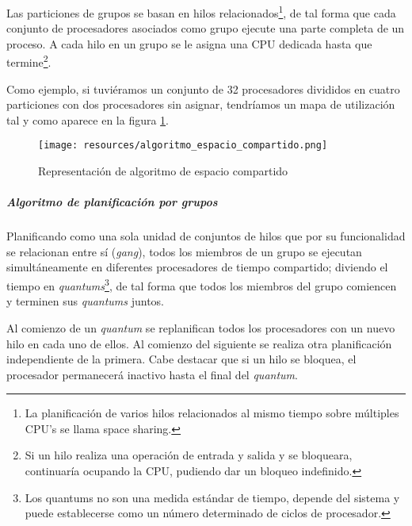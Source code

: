 \documentclass[a4paper, 11pt, titlepage]{article}
\begin{document}
                    Las particiones de grupos se basan en hilos relacionados\footnote{
                        La planificación de varios hilos relacionados al mismo tiempo sobre múltiples CPU’s se 
                        llama space sharing. 
                    }, de tal forma que cada conjunto 
                    de procesadores asociados como grupo ejecute una parte completa de un proceso. A cada hilo 
                    en un grupo se le asigna una CPU dedicada hasta que termine\footnote{
                        Si un hilo realiza una operación de entrada y salida y se bloqueara, continuaría ocupando 
                        la CPU, pudiendo dar un bloqueo indefinido.
                    }.

                    Como ejemplo, si tuviéramos un conjunto de 32 procesadores divididos en cuatro particiones con 
                    dos procesadores sin asignar, tendríamos un mapa de utilización tal y como aparece en la figura 
                    \ref{algoritmo_espacio_compartido}.

                    \begin{figure}[htp]
                        \centering
                        \texttt{[image: resources/algoritmo\_espacio\_compartido.png]}
                        \caption{Representación de algoritmo de espacio compartido}
                        \label{algoritmo_espacio_compartido}
                    \end{figure}

                \subparagraph{Algoritmo de planificación por grupos}

                    Planificando como una sola unidad de conjuntos de hilos que por su funcionalidad se relacionan 
                    entre sí (\textit{gang}), todos los miembros de un grupo se ejecutan simultáneamente en diferentes 
                    procesadores de tiempo compartido; diviendo el tiempo en \textit{quantums}\footnote{
                        Los quantums no son una medida estándar de tiempo, depende del sistema y puede establecerse
                        como un número determinado de ciclos de procesador. 
                    }, de tal forma que todos los miembros del grupo comiencen y terminen sus \textit{quantums} juntos.
               
                    Al comienzo de un \textit{quantum} se replanifican todos los procesadores con un nuevo hilo 
                    en cada uno de ellos. Al comienzo del siguiente se realiza otra planificación independiente de la 
                    primera. Cabe destacar que si un hilo se bloquea, el procesador permanecerá inactivo hasta el 
                    final del \textit{quantum}.
\end{document}

